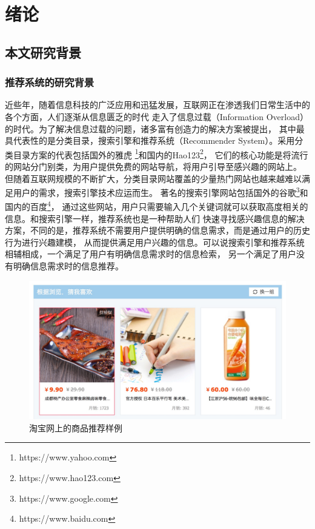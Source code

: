\chapter{绪论}
\section{本文研究背景}
\subsection{推荐系统的研究背景}
近些年，随着信息科技的广泛应用和迅猛发展，互联网正在渗透我们日常生活中的各个方面，人们逐渐从信息匮乏的时代
走入了信息过载（Information Overload）的时代。为了解决信息过载的问题，诸多富有创造力的解决方案被提出，
其中最具代表性的是分类目录，搜索引擎和推荐系统（Recommender System）。采用分类目录方案的代表包括国外的雅虎
\footnote{https://www.yahoo.com}和国内的Hao123\footnote{https://www.hao123.com}，
它们的核心功能是将流行的网站分门别类，为用户提供免费的网站导航，将用户引导至感兴趣的网站上。
但随着互联网规模的不断扩大，分类目录网站覆盖的少量热门网站也越来越难以满足用户的需求，搜索引擎技术应运而生。
著名的搜索引擎网站包括国外的谷歌\footnote{https://www.google.com}和国内的百度\footnote{https://www.baidu.com}，
通过这些网站，用户只需要输入几个关键词就可以获取高度相关的信息。和搜索引擎一样，推荐系统也是一种帮助人们
快速寻找感兴趣信息的解决方案，不同的是，推荐系统不需要用户提供明确的信息需求，而是通过用户的历史行为进行兴趣建模，
从而提供满足用户兴趣的信息。可以说搜索引擎和推荐系统相辅相成，一个满足了用户有明确信息需求时的信息检索，
另一个满足了用户没有明确信息需求时的信息推荐。

\begin{figure}[htbp]
\centering
\includegraphics[scale=0.26]{images/taobao.jpeg}
\caption{淘宝网上的商品推荐样例}
\label{fig:taobao}
\end{figure}


